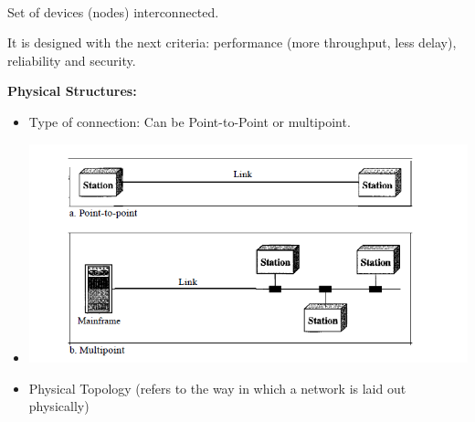 \documentclass[12pt,a4paper]{report}
\begin{document}
\paragraph{} Set of devices (nodes) interconnected.\newline

It is designed with the next criteria: performance (more throughput, less delay), reliability and security.

\textbf{Physical Structures:}
\begin{itemize}
\item Type of connection: Can be Point-to-Point or multipoint.
\item \includegraphics[scale=0.7]{p2p}
\item Physical Topology (refers to the way in which a network is laid out physically)
\begin{enumerate}


\end{enumerate}
\end{itemize}
\end{document}
